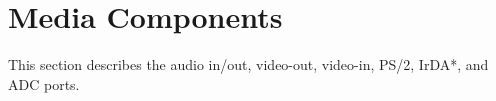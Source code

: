 







\section{Media Components}
\label{sec:multi}

This section describes the audio in/out, video-out, video-in, PS/2, IrDA*, and ADC ports.












